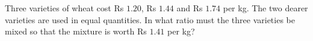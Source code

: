 Three varieties of wheat cost Rs $1.20$, Rs $1.44$ and Rs $1.74$ per kg. The two dearer varieties are used in equal quantities. In what ratio must the three varieties be mixed so that the mixture is worth Rs $1.41$ per kg?
